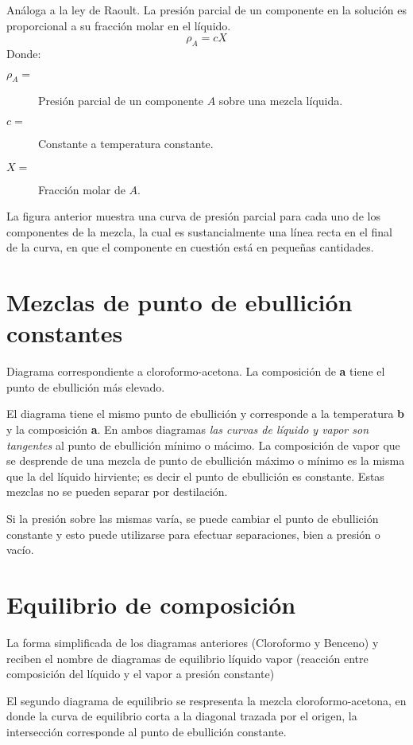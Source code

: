 \documentclass[11pt,openany]{book}
\begin{document}
Análoga a la ley de Raoult. La presión parcial de un componente en la solución es proporcional a su 
fracción molar en el líquido.
\begin{equation}\rho_A=c X\end{equation}
Donde:
\begin{description}
\item [$\rho_A=$] Presión parcial de un componente $A$ sobre una mezcla líquida.
\item [$c=$] Constante a temperatura constante.
\item [$X=$] Fracción molar de $A$.
\end{description}
La figura anterior muestra una curva de presión parcial para cada uno de los componentes de la 
mezcla, la cual es sustancialmente una línea recta en el final de la curva, en que el componente en 
cuestión está en pequeñas cantidades.

\section{Mezclas de punto de ebullición constantes}

Diagrama correspondiente a cloroformo-acetona. La composición de \textbf{a} tiene el punto de ebullición más elevado.

El diagrama tiene el mismo punto de ebullición y corresponde a la temperatura \textbf{b} y la composición \textbf{a}.
En ambos diagramas \textit{las curvas de líquido y vapor son tangentes} al punto de ebullición mínimo o mácimo.
La composición de vapor que se desprende de una mezcla de punto de ebullición máximo o mínimo es la misma que la del líquido
hirviente; es decir el punto de ebullición es constante.
Estas mezclas no se pueden separar por destilación.

Si la presión sobre las mismas varía, se puede cambiar el punto de ebullición constante y esto puede utilizarse para 
efectuar separaciones, bien a presión o vacío.

\section{Equilibrio de composición}

La forma simplificada de los diagramas anteriores (Cloroformo y Benceno) y reciben el nombre de diagramas de equilibrio 
líquido vapor (reacción entre composición del líquido y el vapor a presión constante)

El segundo diagrama de equilibrio se respresenta la mezcla cloroformo-acetona,
 en donde la curva de equilibrio corta a la diagonal trazada por el origen, 
 la intersección corresponde al punto de ebullición constante.
\end{document}
